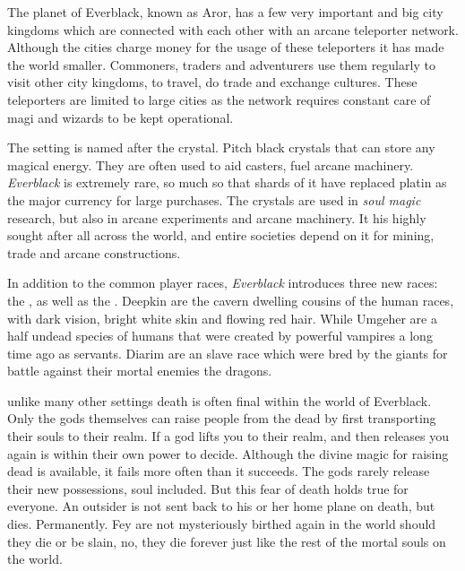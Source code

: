 \begin{enumerate}
  The planet of Everblack, known as Aror, has a
 few very important and big city kingdoms which are connected with each other
 with an arcane teleporter network. Although the cities charge money for the
 usage of these teleporters it has made the world smaller. Commoners, traders
 and adventurers use them regularly to visit other city kingdoms, to travel,
 do trade and exchange cultures. These teleporters are limited to large cities
 as the network requires constant care of magi and wizards to be kept
 operational.

  The setting is named after the 
 crystal. Pitch black crystals that can store any magical energy. They are
 often used to aid casters, fuel arcane machinery. \emph{Everblack} is
 extremely rare, so much so that shards of it have replaced platin as the
 major currency for large purchases. The crystals are used in \emph{soul
 magic} research, but also in arcane experiments and arcane machinery. It his
 highly sought after all across the world, and entire societies depend on it
 for mining, trade and arcane constructions.

  In addition to the common player races, \emph{Everblack}
 introduces three new races: the , 
 as well as the . Deepkin are the cavern dwelling cousins
 of the human races, with dark vision, bright white skin and flowing red
 hair. While Umgeher are a half undead species of humans that were created by
 powerful vampires a long time ago as servants. Diarim are an slave race which
 were bred by the giants for battle against their mortal enemies the dragons.

  unlike many other settings death is often final
 within the world of Everblack. Only the gods themselves can raise people from
 the dead by first transporting their souls to their realm. If a god lifts you
 to their realm, and then releases you again is within their own power to
 decide. Although the divine magic for raising dead is available, it fails more
 often than it succeeds. The gods rarely release their new possessions, soul
 included. But this fear of death holds true for everyone. An outsider is not
 sent back to his or her home plane on death, but dies. Permanently. Fey are
 not mysteriously birthed again in the world should they die or be slain, no,
 they die forever just like the rest of the mortal souls on the world.

\end{enumerate}

